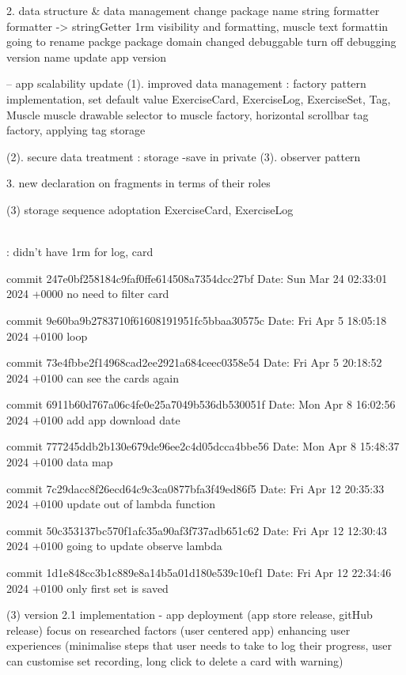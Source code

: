 2. data structure & data management 
change package name
string formatter
formatter -> stringGetter
1rm visibility and formatting, muscle text formattin
going to rename packge
package domain changed
debuggable
turn off debugging
version name update
app version

-- app scalability update
(1). improved data management : factory pattern implementation, set default value 
    ExerciseCard, ExerciseLog, ExerciseSet, Tag, Muscle
    muscle drawable selector to muscle factory, horizontal scrollbar
    tag factory, applying tag storage

(2). secure data treatment : storage -save in private
(3). observer pattern 


3. new declaration on fragments in terms of their roles

(3) storage sequence adoptation 
    ExerciseCard, ExerciseLog






\\ : 
didn't have 1rm for log, card


commit 247e0bf258184c9faf0ffe614508a7354dcc27bf
Date:   Sun Mar 24 02:33:01 2024 +0000
    no need to filter card

commit 9e60ba9b2783710f61608191951fc5bbaa30575c
Date:   Fri Apr 5 18:05:18 2024 +0100
    loop

commit 73e4fbbe2f14968cad2ee2921a684ceec0358e54
Date:   Fri Apr 5 20:18:52 2024 +0100
    can see the cards again

commit 6911b60d767a06c4fe0e25a7049b536db530051f
Date:   Mon Apr 8 16:02:56 2024 +0100
    add app download date

commit 777245ddb2b130e679de96ee2c4d05dcca4bbe56
Date:   Mon Apr 8 15:48:37 2024 +0100
    data map

commit 7c29dacc8f26ecd64c9c3ca0877bfa3f49ed86f5
Date:   Fri Apr 12 20:35:33 2024 +0100
    update out of lambda function

commit 50c353137bc570f1afc35a90af3f737adb651c62
Date:   Fri Apr 12 12:30:43 2024 +0100
    going to update observe lambda


commit 1d1e848cc3b1c889e8a14b5a01d180e539c10ef1
Date:   Fri Apr 12 22:34:46 2024 +0100
    only first set is saved


(3) version 2.1 implementation - app deployment (app store release, gitHub release)
focus on researched factors (user centered app)
enhancing user experiences
(minimalise steps that user needs to take to log their progress, user can customise set recording, long click to delete a card with warning)


